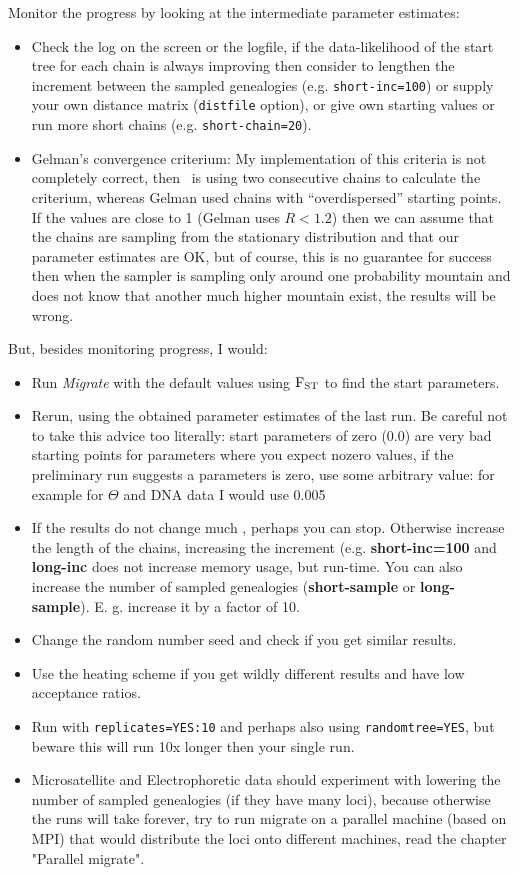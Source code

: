 Monitor the progress by looking at the intermediate parameter estimates:
\begin{itemize}
\item Check the log on the screen or the logfile, if the data-likelihood of 
the start tree for each chain is always improving then consider to lengthen 
the increment between the sampled genealogies (e.g. {\tt short-inc=100}) or
supply 
your own distance matrix ({\tt distfile} option), or give own starting 
values or run more short chains (e.g. {\tt short-chain=20}).
\item Gelman's convergence criterium: My implementation of this criteria
is not completely correct, then \migrate\ is using two consecutive chains
to calculate the criterium, whereas Gelman used chains with ``overdispersed'' 
starting points. If the values are close to 1 (Gelman uses $R < 1.2$) then 
we can assume that the chains are sampling from the stationary distribution 
and that our parameter estimates are OK, but of course, this is no guarantee
for success then when the sampler is sampling only around one probability mountain and
does not know that another much higher mountain exist, the results will be wrong.
\end{itemize}  
But, besides monitoring progress, I would:
\begin{itemize}
\item Run {\it Migrate} with the default values using ${\rm F_{ST}}$ to find
the start parameters.
\item Rerun, using the obtained parameter estimates of the last run. Be careful not to take this advice too literally: start parameters of zero (0.0) are very bad starting points for parameters where you expect nozero values, if the preliminary run suggests a parameters is zero, use some arbitrary value: for example for $\Theta$ and DNA data I would use 0.005 
\item If the results do not change much , perhaps you can stop. Otherwise
increase the length of the chains, increasing the increment 
({e.g. \bf short-inc=100} and {\bf long-inc} does not
increase memory usage, but run-time. 
You can also increase the number of sampled
genealogies ({\bf short-sample} or {\bf long-sample}).
E. g. increase it by a factor of 10.
\item Change the random number seed and check if you get similar results.
\item Use the heating scheme if you get wildly different results and
have low acceptance ratios.
\item Run with {\tt replicates=YES:10} and perhaps also using
{\tt randomtree=YES}, but beware this will run 10x longer then your single
run.
\item Microsatellite and Electrophoretic data should experiment with
lowering the number of sampled genealogies (if they have many loci), because
otherwise the runs will take forever, try to run migrate on a parallel machine 
(based on MPI) that would distribute the loci
onto different machines, read the chapter "Parallel migrate".
\end{itemize}

